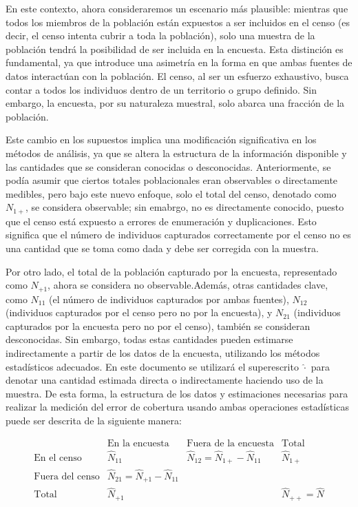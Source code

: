 \documentclass[
  12pt,
]{book}
\begin{document}
En este contexto, ahora consideraremos un escenario más plausible: mientras que todos los miembros de la población están expuestos a ser incluidos en el censo (es decir, el censo intenta cubrir a toda la población), solo una muestra de la población tendrá la posibilidad de ser incluida en la encuesta. Esta distinción es fundamental, ya que introduce una asimetría en la forma en que ambas fuentes de datos interactúan con la población. El censo, al ser un esfuerzo exhaustivo, busca contar a todos los individuos dentro de un territorio o grupo definido. Sin embargo, la encuesta, por su naturaleza muestral, solo abarca una fracción de la población.

Este cambio en los supuestos implica una modificación significativa en los métodos de análisis, ya que se altera la estructura de la información disponible y las cantidades que se consideran conocidas o desconocidas. Anteriormente, se podía asumir que ciertos totales poblacionales eran observables o directamente medibles, pero bajo este nuevo enfoque, solo el total del censo, denotado como \(N_{1+}\), se considera observable; sin emabrgo, no es directamente conocido, puesto que el censo está expuesto a errores de enumeración y duplicaciones. Esto significa que el número de individuos capturados correctamente por el censo no es una cantidad que se toma como dada y debe ser corregida con la muestra.

Por otro lado, el total de la población capturado por la encuesta, representado como \(N_{+1}\), ahora se considera no observable.Además, otras cantidades clave, como \(N_{11}\) (el número de individuos capturados por ambas fuentes), \(N_{12}\) (individuos capturados por el censo pero no por la encuesta), y \(N_{21}\) (individuos capturados por la encuesta pero no por el censo), también se consideran desconocidas. Sin embargo, todas estas cantidades pueden estimarse indirectamente a partir de los datos de la encuesta, utilizando los métodos estadísticos adecuados. En este documento se utilizará el superescrito \(\hat \cdot\) para denotar una cantidad estimada directa o indirectamente haciendo uso de la muestra. De esta forma, la estructura de los datos y estimaciones necesarias para realizar la medición del error de cobertura usando ambas operaciones estadísticas puede ser descrita de la siguiente manera:

\[
    \begin{array}{c|cc|c}
    & \text{En la encuesta} & \text{Fuera de la encuesta} & \text{Total} \\
    \hline
    \text{En el censo} & \hat{N}_{11} & \hat{N}_{12} = \hat{N}_{1+} - \hat{N}_{11} & \hat{N}_{1+} \\
    \text{Fuera del censo} & \hat{N}_{21} = \hat{N}_{+1} - \hat{N}_{11} &  &  \\
    \hline
    \text{Total} & \hat{N}_{+1} &  & \hat{N}_{++} = \hat{N}
    \end{array}
    \]
\end{document}

